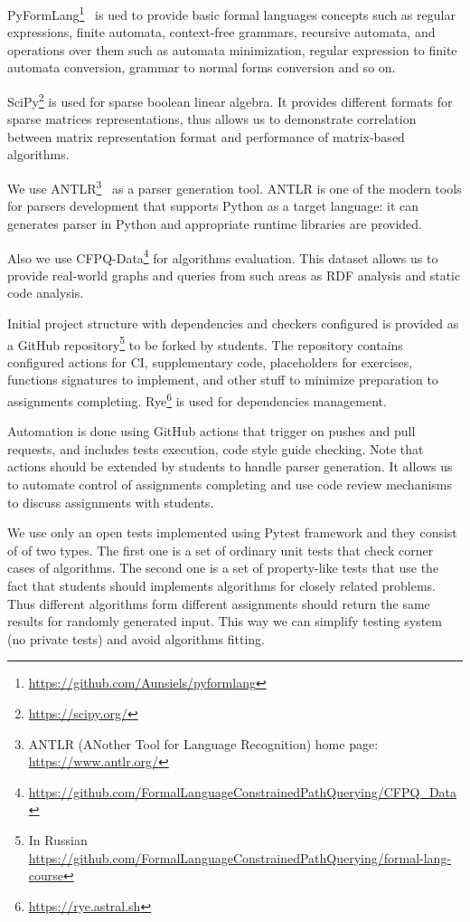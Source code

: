 \documentclass[sigconf]{acmart}
\begin{document}
PyFormLang\footnote{\url{https://github.com/Aunsiels/pyformlang}}~\cite{10.1145/3408877.3432464} is ued to provide basic formal languages concepts such as regular expressions, finite automata, context-free grammars, recursive automata, and operations over them such as automata minimization, regular expression to finite automata conversion, grammar to normal forms conversion and so on. 

SciPy\footnote{\url{https://scipy.org/}} is used for sparse boolean linear algebra.
It provides different formats for sparse matrices representations, thus allows us to demonstrate correlation between matrix representation format and performance of matrix-based algorithms. 

We use ANTLR\footnote{ANTLR (ANother Tool for Language Recognition) home page: \url{https://www.antlr.org/}}~\cite{10.5555/2501720} as a parser generation tool.
ANTLR is one of the modern tools for parsers development that supports Python as a target language: it can generates parser in Python and appropriate runtime libraries are provided.

Also we use CFPQ-Data\footnote{\url{https://github.com/FormalLanguageConstrainedPathQuerying/CFPQ_Data}} for algorithms evaluation.
This dataset allows us to provide real-world graphs and queries from such areas as RDF analysis and static code analysis. 

Initial project structure with dependencies and checkers configured is provided as a GitHub repository\footnote{In Russian \url{https://github.com/FormalLanguageConstrainedPathQuerying/formal-lang-course}} to be forked by students.
The repository contains configured actions for CI, supplementary code, placeholders for exercises, functions signatures to implement, and other stuff to minimize preparation to assignments completing.
Rye\footnote{\url{https://rye.astral.sh}} is used for dependencies management.

Automation is done using GitHub actions that trigger on pushes and pull requests, and includes tests execution, code style guide checking.
Note that actions should be extended by students to handle parser generation.
It allows us to automate control of assignments completing and use code review mechanisms to discuss assignments with students.

We use only an open tests implemented using Pytest framework and they consist of of two types.
The first one is a set of ordinary unit tests that check corner cases of algorithms.
The second one is a set of property-like tests that use the fact that students should implements algorithms for closely related problems.
Thus different algorithms form different assignments should return the same results for randomly generated input. 
This way we can simplify testing system (no private tests) and avoid algorithms fitting. 
\end{document}
